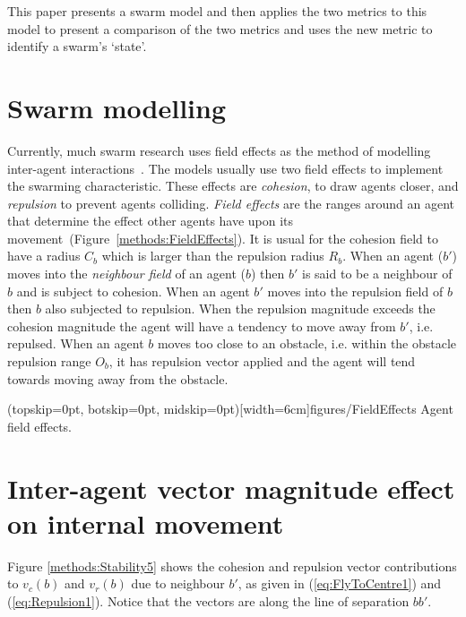 \documentclass{ieeeaccess}
\begin{document}
This paper presents a swarm model and then applies the two metrics to this model to present a comparison of the two metrics and uses the new metric to identify a swarm's `state'.
 
\section{Swarm modelling}\label{SwarmModelling}
Currently, much swarm research uses field effects as the method of modelling inter-agent interactions~\cite{BAF:06, BAFVM:06, BM:09, APZDAMC:09, GP:02, GP:04, GP:04a, GP:05, GP:11, MYP:09}. The models usually use two field effects to implement the swarming characteristic. These effects are \emph{cohesion}, to draw agents closer, and \emph{repulsion} to prevent agents colliding. \emph{Field effects} are the ranges around an agent that determine the effect other agents have upon its movement~(Figure~\ref{methods:FieldEffects}). It is usual for the cohesion field to have a radius $C_b$ which is larger than the repulsion radius $R_b$. When an agent ($b'$) moves into the \emph{neighbour field} of an agent ($b$) then $b'$ is said to be a neighbour of $b$ and is subject to cohesion. When an agent $b'$ moves into the repulsion field of $b$ then $b$ also subjected to repulsion. When the repulsion magnitude exceeds the cohesion magnitude the agent will have a tendency to move away from $b'$, i.e. repulsed. When an agent $b$ moves too close to an obstacle, i.e. within the obstacle repulsion range $O_b$, it has repulsion vector applied and the agent will tend towards moving away from the obstacle.

\Figure[t!](topskip=0pt, botskip=0pt, midskip=0pt)[width=6cm]{figures/FieldEffects}
{Agent field effects.\label{methods:FieldEffects}}


\section{Inter-agent vector magnitude effect on internal movement}\label{Section:StabilityMagnitude}
Figure \ref{methods:Stability5} shows the cohesion and repulsion vector contributions to $v_c(b)$ and $v_r(b)$ due to neighbour $b'$, as given in (\ref{eq:FlyToCentre1}) and (\ref{eq:Repulsion1}). Notice that the vectors are along the line of separation $bb'$. \\
\end{document}
